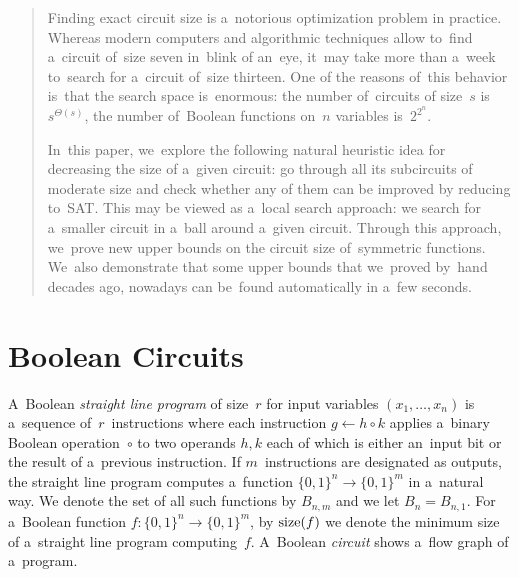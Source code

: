\maketitle

\begin{abstract}
Finding exact circuit size 
is a~notorious optimization
problem in practice. Whereas modern computers 
and algorithmic techniques allow to~find a~circuit 
of~size seven in~blink of an~eye, it~may take more 
than a~week to~search for a~circuit of~size thirteen.
One of the reasons of~this behavior is~that the search 
space is~enormous: the number of~circuits of size~$s$ 
is~$s^{\Theta(s)}$, the number of~Boolean functions on~$n$ variables is~$2^{2^n}$.

In~this paper, we~explore the following natural
heuristic idea for decreasing the size of
a~given circuit: go through all its subcircuits
of moderate size and check whether 
any of them can be improved by reducing to~SAT. 
This may be viewed
as a~local search approach: we search for a~smaller
circuit in a~ball around a~given circuit.
Through this approach, we~prove
new upper bounds on the circuit size 
of~symmetric functions. We~also demonstrate that
some upper bounds that we~proved by~hand
decades ago, nowadays can be~found automatically
in a~few seconds.
\end{abstract}




\section{Boolean Circuits}
A~Boolean \emph{straight line program} 
of size~$r$ for input variables $(x_1, \dotsc, x_n)$ 
is a~sequence of~$r$~instructions where each 
instruction $g \gets h \circ k$ 
applies a~binary Boolean operation~$\circ$ to 
two operands $h,k$ each of which is either an~input bit 
or the result of a~previous instruction. 
If $m$~instructions are designated as outputs,
the straight line program computes a~function 
$\{0,1\}^n \to \{0,1\}^m$ in a~natural way. 
We denote the set of all such functions by $B_{n,m}$ and we let $B_n=B_{n,1}$.
For 
a~Boolean function $f \colon \{0,1\}^n \to \{0,1\}^m$,
by $\operatorname{size}(f)$ we denote the minimum size of 
a~straight line program
computing~$f$. A~Boolean \emph{circuit} 
shows a~flow graph of a~program.

